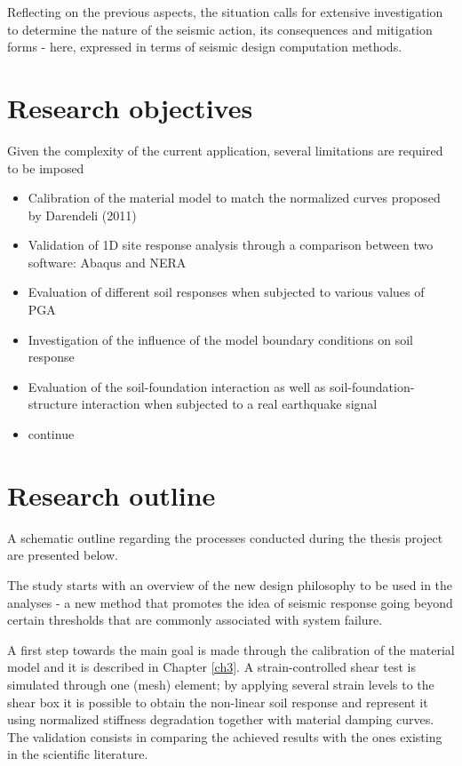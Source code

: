 \documentclass[10pt,a4paper]{report}
\begin{document}
Reflecting on the previous aspects, the situation calls for extensive investigation to determine the nature of the seismic action, its consequences and mitigation forms - here, expressed in terms of seismic design computation methods. 

\section{Research objectives}
Given the complexity of the current application, several limitations are required to be imposed
\begin{itemize}
	\item Calibration of the material model to match the normalized curves proposed by Darendeli (2011)\\
	\item Validation of 1D site response analysis through a comparison between two software: Abaqus and NERA
	\item Evaluation of different soil responses when subjected to various values of PGA
	\item Investigation of the influence of the model boundary conditions on soil response
	\item Evaluation of the soil-foundation interaction as well as soil-foundation-structure interaction when subjected to a real earthquake signal
	\item continue
\end{itemize}

\section{Research outline}
A schematic outline regarding the processes conducted during the thesis project are presented below. 

The study starts with an overview of the new design philosophy to be used in the analyses - a new method that promotes the idea of seismic response going beyond certain thresholds that are commonly associated with system failure. 

A first step towards the main goal is made through the calibration of the material model and it is described in Chapter \ref{ch3}. A strain-controlled shear test is simulated through one (mesh) element;  by applying several strain levels to the shear box it is possible to obtain the non-linear soil response and represent it using normalized stiffness degradation together with material damping curves. The validation consists in comparing the achieved results with the ones existing in the scientific literature.
\end{document}
